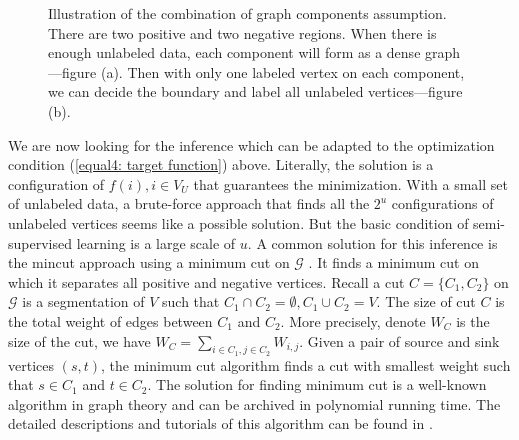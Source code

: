 \begin{figure}[!ht]
\begin{subfigure}[b]{0.4\textwidth}
		\caption{}
		\label{fig4.b: combination of components assumption}
	\end{subfigure}
	\hfill
	\caption[Illustration of the combination of graph components assumption.]{Illustration of the combination of graph components assumption. There are two positive and two negative regions. When there is enough unlabeled data, each component will form as a dense graph---figure (a). Then with only one labeled vertex on each component, we can decide the boundary and label all unlabeled vertices---figure (b).}
	\label{fig4: combination of components assumption}
\end{figure}

We are now looking for the inference which can be adapted to the optimization condition (\ref{equal4: target function}) above. Literally, the solution is a configuration of $f(i), i \in V_U$ that guarantees the minimization. With a small set of unlabeled data, a brute-force approach that finds all the $2^u$ configurations of unlabeled vertices seems like a possible solution. But the basic condition of semi-supervised learning is a large scale of $u$. A common solution for this inference is the mincut approach using a minimum cut on $\mathcal{G}$ \parencite{Blum:2001:LLU:645530.757779}. It finds a minimum cut on which it separates all positive and negative vertices. Recall a cut $C= \{C_1, C_2\}$ on $\mathcal{G}$ is a segmentation of $V$ such that $C_1 \cap C_2 = \emptyset, C_1 \cup C_2 = V$. The size of cut $C$ is the total weight of edges between $C_1$ and $C_2$. More precisely, denote $W_C$ is the size of the cut, we have $W_C = \sum_{i \in C_1, j \in C_2} W_{i,j}$. Given a pair of source and sink vertices $(s, t)$, the minimum cut algorithm finds a cut with smallest weight such that $s \in C_1$ and $t \in C_2$. The solution for finding minimum cut is a well-known algorithm in graph theory and can be archived in polynomial running time. The detailed descriptions and tutorials of this algorithm can be found in \parencite{cormen2009introduction, West2001}.

